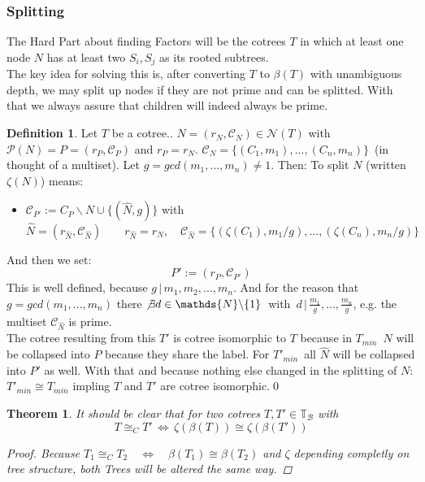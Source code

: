 \documentclass[a4paper,12pt]{article}
\newtheorem{theorem}{Theorem}[section]
\theoremstyle{definition}
\newtheorem{definition}{Definition}[section]
\begin{document}
		\subsubsection{Splitting}
		The Hard Part about finding Factors will be the cotrees $T$ in which at least one node $N$ has at least two $S_i, S_j$ as its rooted subtrees.\\
		The key idea for solving this is, after converting $T$ to $\beta(T)$ with unambiguous depth, we may split up nodes if they are not prime and can be splitted. With that we always assure that children will indeed always be prime.
		\begin{definition}
			Let $T$ be a cotree.. $N=(r_N,\mathcal{C}_N)\in \mathcal{N}(T)$ with $\mathcal{P}(N)=P=(r_P,\mathcal{C}_P)$ and $r_P=r_N$. $\mathcal{C}_N=\{(C_1,m_1),...,(C_n,m_n)\}\, $ (in thought of a multiset). Let $g = gcd(m_1,...,m_n)\not= 1$. Then:
			To split $N$ (written $\zeta(N)$)  means:
			\begin{itemize}
				\item $\mathcal{C}_{P'} := C_P\backslash N \cup  \{(\hat{N},g )\}$ with
				\[\hat{N}=(r_{\hat{N}}, \mathcal{C}_{\hat{N}})\qquad r_{\hat{N}}=r_N,\quad \mathcal{C}_{\hat{N}}=\{(\zeta(C_1),m_1/g),...,(\zeta(C_n),m_n/g)\}\]
			\end{itemize} 
			And then we set:
			 \[P':= (r_P, \mathcal{C}_{P'})\]
			This is well defined, because $g\,\big | \,m_1,m_2,...,m_n$. And for the reason that $g=gcd(m_1,...,m_n)$ there $\not\exists d\in \mathds{N}\backslash \{1\}\,$ with $\,d\,\big | \, \frac{m_1}{g},...,\frac{m_n}{g}$, e.g. the multiset $\mathcal{C}_{\hat{N}}$ is prime.\\ The cotree resulting from this $T'$ is cotree isomorphic to $T$ because in $T_{min}\,$ $N$ will be collapsed into $P$ because they share the label. For $T'_{min}\,$ all $\hat{N}$ will be collapsed into $P'$ as well. With that and because nothing else changed in the splitting of $N$: $T'_{min}\cong T_{min}$ impling $T$ and $T'$ are cotree isomorphic.\qed
		\end{definition}
		\begin{theorem}
			It should be clear that  for two cotrees $T,T'\in\mathds{T}_{\mathcal{B}} $ with 
			\[T\cong_C T'  \,\Longleftrightarrow\, \zeta{(\beta(T))} \cong \zeta{(\beta(T'))
			}\]
			\begin{proof}
				Because $T_1 \cong_C T_2 \quad \Longleftrightarrow \quad\beta(T_1)\cong \beta(T_2)$ and $\zeta$ depending completly on tree structure, both Trees will be altered the same way.
			\end{proof}
		\end{theorem}
\end{document}
